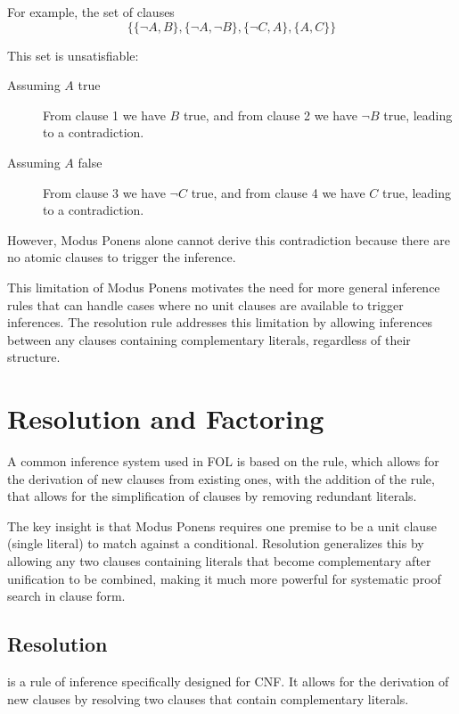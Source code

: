 For example, the set of clauses
\begin{equation}\label{eq:example_unsat}  
  \{\{\neg A, B\},\{\neg A , \neg B\}, \{\neg C , A\}, \{A , C\}\}
\end{equation}


This set is unsatisfiable:
\begin{description}
  \item[Assuming \(A\) true] From clause 1 we have \(B\) true, and from clause 2 we have \(\neg B\) true, leading to a contradiction.
  \item[Assuming \(A\) false] From clause 3 we have \(\neg C\) true, and from clause 4 we have \(C\) true, leading to a contradiction.
\end{description}
However, Modus Ponens alone cannot derive this contradiction because there are no atomic clauses to trigger the inference.

This limitation of Modus Ponens motivates the need for more general inference rules that can handle cases where no unit clauses are available to trigger inferences.
The resolution rule addresses this limitation by allowing inferences between any clauses containing complementary literals, regardless of their structure.

\section{Resolution and Factoring}\label{sec:resolution-factoring}

A common inference system used in FOL is based on the  rule, which allows for the derivation of new clauses from existing ones, with the addition of the  rule, that allows for the simplification of clauses by removing redundant literals.

The key insight is that Modus Ponens requires one premise to be a unit clause (single literal) to match against a conditional.
Resolution generalizes this by allowing any two clauses containing literals that become complementary after unification to be combined, making it much more powerful for systematic proof search in clause form.

\subsection{Resolution}\label{subsec:resolution}

 is a rule of inference specifically designed for CNF\@. It allows for the derivation of new clauses by resolving two clauses that contain complementary literals.

